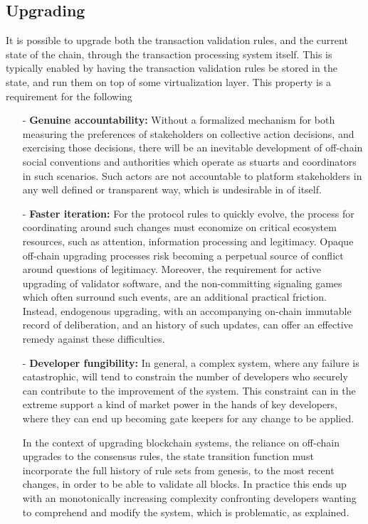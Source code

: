 \documentclass{article}
\begin{document}
\subsection{Upgrading}

It is possible to upgrade both the transaction validation rules, and the current state of the chain, through the transaction processing system itself. This is typically enabled by having the transaction validation rules be stored in the state, and run them on top of some virtualization layer. This property is a requirement for the following

\begin{itemize}

    \item[-] \textbf{Genuine accountability:} Without a formalized mechanism for both measuring the preferences of stakeholders on collective action decisions, and exercising those decisions, there will be an inevitable development of off-chain social conventions and authorities which operate as stuarts and coordinators in such scenarios. Such actors are not accountable to platform stakeholders in any well defined or transparent way, which is undesirable in of itself.

    \item[-] \textbf{Faster iteration:} For the protocol rules to quickly evolve, the process for coordinating around such changes must economize on critical ecosystem resources, such as attention, information processing and legitimacy. Opaque off-chain upgrading processes risk becoming a perpetual source of conflict around questions of legitimacy. Moreover, the requirement for active upgrading of validator software, and the non-committing signaling games which often surround such events, are an additional practical friction. Instead, endogenous upgrading, with an accompanying on-chain immutable record of deliberation, and an history of such updates, can offer an effective remedy against these difficulties.

    \item[-] \textbf{Developer fungibility:} In general, a complex system, where any failure is catastrophic, will tend to constrain the number of developers who securely can contribute to the improvement of the system. This constraint can in the extreme support a kind of market power in the hands of key developers, where they can end up becoming gate keepers for any change to be applied.

    In the context of upgrading blockchain systems, the reliance on off-chain upgrades to the consensus rules, the state transition function must incorporate the full history of rule sets from genesis, to the most recent changes, in order to be able to validate all blocks. In practice this ends up with an monotonically increasing complexity confronting developers wanting to comprehend and modify the system, which is problematic, as explained.

\end{itemize}
\end{document}
